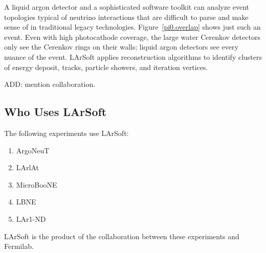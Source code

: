 \documentclass[12pt]{elsarticle}
\begin{document}
A liquid argon detector and a sophisticated software toolkit can analyze event topologies typical of neutrino interactions that are difficult to parse and make sense of in traditional legacy technologies. Figure~\ref{pi0.overlap} shows just such an event. Even with high photocathode coverage, the large water Cerenkov detectors only see the Cerenkov rings on their walls; liquid argon detectors see every nuance of the event. LArSoft applies reconstruction algorithms to identify clusters of energy deposit, tracks, particle showers, and iteration vertices.

ADD: mention collaboration.

\subsection{Who Uses LArSoft}
The following experiments use LArSoft:
\begin{enumerate}
\item ArgoNeuT
\item LArlAt
\item MicroBooNE
\item LBNE
\item LAr1-ND
\end{enumerate}

LArSoft is the product of the collaboration between these experiments and Fermilab.
\end{document}

